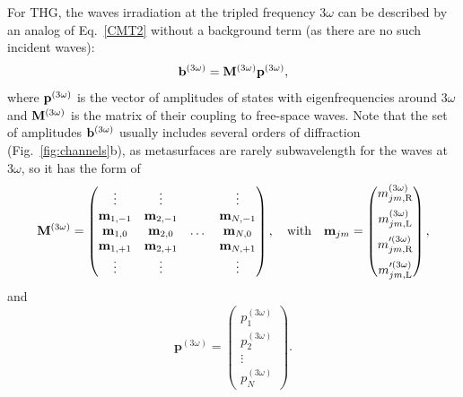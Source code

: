 \documentclass[
    reprint,
    superscriptaddress,
    a4paper,
    amsmath,amssymb,
    prb,
]{revtex4-2}
\begin{document}
For THG, the waves irradiation at the tripled frequency $3\omega$ can be described by an analog of Eq.~\eqref{CMT2} without a background term (as there are no such incident waves):
\begin{equation}\label{CMTTH}
	{\bf b}^{(3\omega)}={\bf M}^{(3\omega)}{\bf p}^{(3\omega)}, 
\end{equation}
where ${\bf p}^{(3\omega)}$ is the vector of amplitudes of states with eigenfrequencies around $3\omega$ and ${\bf M}^{(3\omega)}$ is the matrix of their coupling to free-space waves. Note that the set of amplitudes ${\bf b}^{(3\omega)}$ usually includes several orders of diffraction (Fig.~\ref{fig:channels}b), as metasurfaces are rarely subwavelength for the waves at $3\omega$, so it has the form of
\begin{equation} \label{eq:M3w}
	\mathbf{M}^{(3\omega)} = \begin{pmatrix}
		\vdots  & \vdots  & & \vdots \\ 
		\mathbf{m}_{1,-1} & \mathbf{m}_{2,-1} & & \mathbf{m}_{N,-1} \\
		\mathbf{m}_{1, 0} & \mathbf{m}_{2, 0} & \dots & \mathbf{m}_{N,0}  \\
		\mathbf{m}_{1,+1} & \mathbf{m}_{2,+1} & & \mathbf{m}_{N,+1} \\ 
		\vdots & \vdots & & \vdots
	\end{pmatrix}, \quad \text{with} \quad \mathbf{m}_{jm} = \begin{pmatrix}
		m^{(3\omega)}_{jm,\text{R}}  \vspace{0.2cm} \\  
		m^{(3\omega)}_{jm,\text{L}} \vspace{0.2cm} \\
		m^{\prime(3\omega)}_{jm,\text{R}} \vspace{0.2cm} \\
		m^{\prime(3\omega)}_{jm,\text{L}} 
	\end{pmatrix},
\end{equation}
and 
\begin{equation}
	\mathbf{p}^{(3\omega)} = \begin{pmatrix}
		p_1^{(3\omega)} \\ p_2^{(3\omega)} \\ \vdots \\ p_N^{(3\omega)} 
	\end{pmatrix}.
\end{equation}
\end{document}
